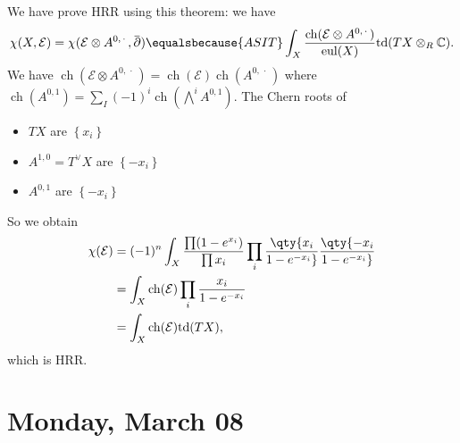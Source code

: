 \begin{example}[?]

We have prove HRR using this theorem: we have
\begin{align*}
\chi(X, \mathcal{E} ) = \chi( \mathcal{E} \otimes A^{0, {\,\cdot\,}}, \mkern 1.5mu\overline{\mkern-1.5mu{\partial}\mkern-1.5mu}\mkern 1.5mu) \equalsbecause{ASIT} \int_X { \operatorname{ch}(\mathcal{E} \otimes A^{0, {\,\cdot\,}} ) \over {\operatorname{eul}}(X) } \mathrm{td}(TX \otimes_R {\mathbb{C}})
.\end{align*}
We have
\(\operatorname{ch}( \mathcal{E} \otimes A^{0, {\,\cdot\,}} ) = \operatorname{ch}(\mathcal{E}) \operatorname{ch}( A^{0, {\,\cdot\,}} )\)
where
\(\operatorname{ch}(A^{0, 1}) = \sum_I (-1)^i \operatorname{ch}(\bigwedge^i A^{0, 1} )\).
The Chern roots of

\begin{itemize}
\tightlist
\item
  \(TX\) are \(\left\{{ x_i }\right\}\)\\
\item
  \(A^{1, 0} = T^\vee X\) are \(\left\{{ -x_i }\right\}\)\\
\item
  \(A^{0, 1}\) are \(\left\{{ -x_i }\right\}\)
\end{itemize}

So we obtain
\begin{align*}
\chi( \mathcal{E} ) 
&= (-1)^n \int_X {\prod ( 1- e^{x_i}) \over \prod x_i}
\prod_i 
\qty{x_i \over 1 - e^{-x_i}} 
\qty{-x_i \over 1 - e^{-x_i}} \\
&= \int_X \operatorname{ch}( \mathcal{E} ) \prod_i {x_i \over 1-e^{-x_i} } \\
&= \int_X \operatorname{ch}( \mathcal{E} ) \mathrm{td}(TX)
,\end{align*}
which is HRR.

\end{example}

\hypertarget{monday-march-08}{%
\section{Monday, March 08}\label{monday-march-08}}

